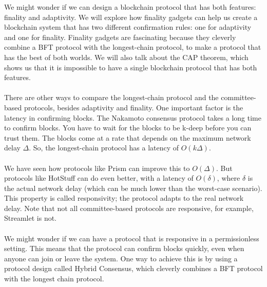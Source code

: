 \documentclass{report}
\begin{document}
We might wonder if we can design a blockchain protocol that has both features: finality and adaptivity.
We will explore how finality gadgets can help us create a blockchain system that has two different confirmation rules: one for adaptivity and one for finality. Finality gadgets are fascinating because they cleverly combine a BFT protocol with the longest-chain protocol, to make a protocol that has the best of both worlds. We will also talk about the CAP theorem, which shows us that it is impossible to have a single blockchain protocol that has both features.\\\\
There are other ways to compare the longest-chain protocol and the committee-based protocols, besides adaptivity and finality. One important factor is the latency in confirming blocks. The Nakamoto consensus protocol takes a long time to confirm blocks. You have to wait for the blocks to be k-deep before you can trust them. The blocks come at a rate that depends on the maximum network delay $\Delta$. So, the longest-chain protocol has a latency of $O(k\Delta)$.\\\\
We have seen how protocols like Prism can improve this to $O(\Delta)$. But protocols like HotStuff can do even better, with a latency of $O(\delta)$, where $\delta$ is the actual network delay (which can be much lower than the worst-case scenario). This property is called responsivity; the protocol adapts to the real network delay. Note that not all committee-based protocols are responsive, for example, Streamlet is not.\\\\
We might wonder if we can have a protocol that is responsive in a permissionless setting. This means that the protocol can confirm blocks quickly, even when anyone can join or leave the system. One way to achieve this is by using a protocol design called Hybrid Consensus, which cleverly combines a BFT protocol with the longest chain protocol.
\end{document}
